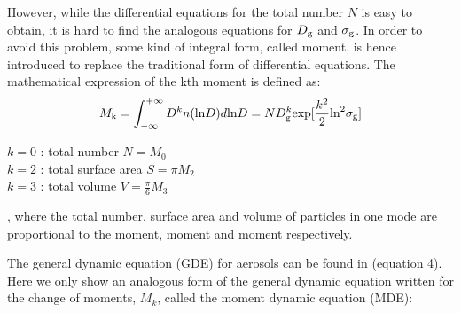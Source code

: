 \documentclass[12pt, fullpage]{uiucthesis2009}
\begin{document}
		However, while the differential equations for the total number $N$ is easy to obtain, it is hard to find the analogous equations for $D_{\rm g}$ and $\sigma_{\rm g}$. In order to avoid this problem, some kind of integral form, called moment, is hence introduced to replace the traditional form of differential equations. The mathematical expression of the kth moment is defined as:
		\begin{align}
		M_\text{k} = \int_{-\infty}^{+\infty}D^kn(\text{ln}D)d\text{ln}D = ND_{\rm g}^k\text{exp}[\frac{k^2}{2}\text{ln}^2\sigma_{\rm g}]
		\end{align}
		\begin{flushleft}
			$k = 0$ : total number $N = M_0$ \\
			$k = 2$ : total surface area $S = \pi M_2$ \\
			$k = 3$ : total volume $V = \frac{\pi}{6}M_3$ \\
		\end{flushleft}
		, where the total number, surface area and volume of particles in one mode are proportional to the  moment,  moment and  moment respectively. 
		
		The general dynamic equation (GDE) for aerosols can be found in \cite{whitby1997} (equation 4). Here we only show an analogous form of the general dynamic equation written for the change of moments, $M_{k}$, called the moment dynamic equation (MDE):
		
\end{document}
